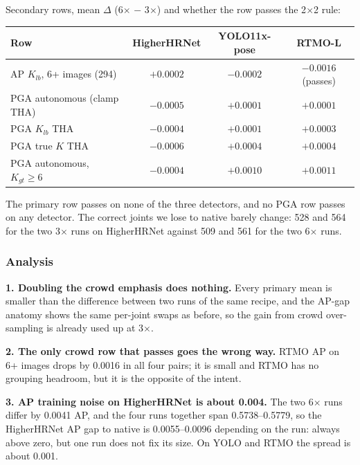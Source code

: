 \vspace{0.5em}

Secondary rows, mean $\Delta$ (6$\times$ $-$ 3$\times$) and whether the row passes the 2$\times$2 rule:

{\small\setlength{\tabcolsep}{4pt}
\begin{tabular}{lccc}
\hline
\textbf{Row} & \textbf{HigherHRNet} & \textbf{YOLO11x-pose} & \textbf{RTMO-L} \\
\hline
AP $K_{lb}$, 6+ images (294)        & $+0.0002$ & $-0.0002$ & $-0.0016$ (passes) \\
PGA autonomous (clamp THA)          & $-0.0005$ & $+0.0001$ & $+0.0001$ \\
PGA $K_{lb}$ THA                    & $-0.0004$ & $+0.0001$ & $+0.0003$ \\
PGA true $K$ THA                    & $-0.0006$ & $+0.0004$ & $+0.0004$ \\
PGA autonomous, $K_{gt} \geq 6$     & $-0.0004$ & $+0.0010$ & $+0.0011$ \\
\hline
\end{tabular}
}

\vspace{0.5em}

The primary row passes on none of the three detectors, and no PGA row passes on any detector.
The correct joints we lose to native barely change: 528 and 564 for the two 3$\times$ runs on HigherHRNet against 509 and 561 for the two 6$\times$ runs.

\subsubsection{Analysis}

\textbf{1. Doubling the crowd emphasis does nothing.} Every primary mean is smaller than the difference between two runs of the same recipe, and the AP-gap anatomy shows the same per-joint swaps as before, so the gain from crowd over-sampling is already used up at 3$\times$.

\textbf{2. The only crowd row that passes goes the wrong way.} RTMO AP on 6+ images drops by 0.0016 in all four pairs; it is small and RTMO has no grouping headroom, but it is the opposite of the intent.

\textbf{3. AP training noise on HigherHRNet is about 0.004.} The two 6$\times$ runs differ by 0.0041 AP, and the four runs together span 0.5738--0.5779, so the HigherHRNet AP gap to native is 0.0055--0.0096 depending on the run: always above zero, but one run does not fix its size. On YOLO and RTMO the spread is about 0.001.

